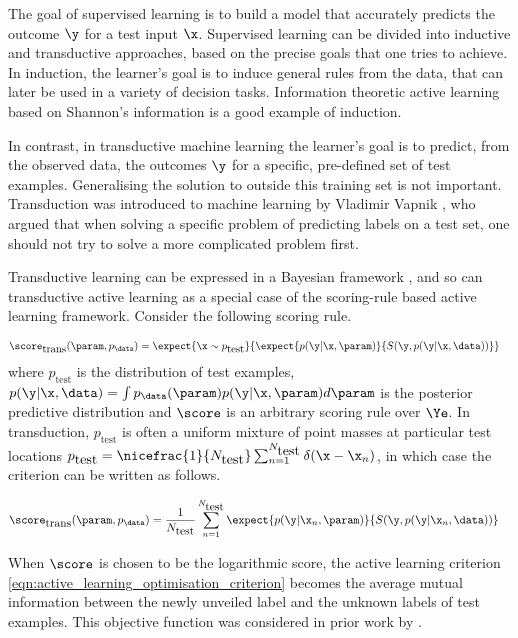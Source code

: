 The goal of supervised learning is to build a model that accurately predicts the outcome $\y$ for a test input $\x$. Supervised learning can be divided into inductive and transductive approaches, based on the precise goals that one tries to achieve. In induction, the learner's goal is to induce general rules from the data, that can later be used in a variety of decision tasks. Information theoretic active learning based on Shannon's information is a good example of induction.

In contrast, in transductive machine learning the learner's goal is to predict, from the observed data, the outcomes $\y$ for a specific, pre-defined set of test examples. Generalising the solution to outside this training set is not important. Transduction was introduced to machine learning by Vladimir Vapnik \citep[see \eg][]{Gammerman1998}, who argued that when solving a specific problem of predicting labels on a test set, one should not try to solve a more complicated problem first.

Transductive learning can be expressed in a Bayesian framework \citep{Graepel1999}, and so can transductive active learning as a special case of the scoring-rule based active learning framework. Consider the following scoring rule.

\begin{align}
	\score_{\mbox{trans}}(\param,p_\data) &= \expect{\x\sim p_{\mbox{test}}}{\expect{p(\y\vert\x,\param)}{S(\y,p(\y\vert\x,\data))}}
\end{align}
where $p_{\mbox{test}}$ is the distribution of test examples, $p(\y\vert\x,\data)=\int p_{\data}(\param) p(\y\vert\x,\param) d\param $ is the posterior predictive distribution and $\score$ is an arbitrary scoring rule over $\Ye$. In transduction, $p_{\mbox{test}}$ is often a uniform mixture of point masses at particular test locations $p_{\mbox{test}} = \nicefrac{1}{N_{\mbox{test}}}\sum_{n=1}^{N_{\mbox{test}}} \delta(\x - \x_n)$, in which case the criterion can be written as follows.

\begin{align}
	\score_{\mbox{trans}}(\param,p_\data) &= \frac{1}{N_{\mbox{test}}}\sum_{n=1}^{N_{\mbox{test}}} \expect{p(\y\vert\x_n,\param)}{S(\y,p(\y\vert\x_n,\data))}
\end{align}

When $\score$ is chosen to be the logarithmic score, the active learning criterion \eqref{eqn:active_learning_optimisation_criterion} becomes the average mutual information between the newly unveiled label and the unknown labels of test examples. This objective function was considered in prior work by \citet{MacKay1992}.


